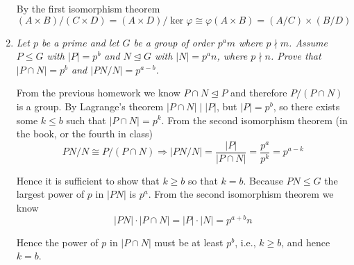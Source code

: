 \documentclass[letterpaper, 11pt]{article}
\begin{document}
\begin{enumerate}
By the first isomorphism theorem $$(A \times B)/(C \times D) = (A \times D)/\ker \varphi \cong \varphi(A \times B) = (A/C) \times (B/D)$$
\item \emph{Let $p$ be a prime and let $G$ be a group of order $p^am$ where $p \nmid m$.  Assume $P \leq G$ with $|P|=p^b$ and $N \unlhd G$ with $|N| = p^an$, where $p \nmid n$.  Prove that $|P \cap N| = p^b$ and $|PN/N| = p^{a-b}$.}

From the previous homework we know $P \cap N \unlhd P$ and therefore $P / (P \cap N)$ is a group.  By Lagrange's theorem $|P \cap N| \mid |P|$, but $|P| = p^b$, so there exists some $k \leq b$ such that $|P \cap N| = p^k$.  From the second isomorphism theorem (in the book, or the fourth in class)
\[
PN/N \cong P/(P \cap N) \Rightarrow |PN/N| = \frac{|P|}{|P \cap N|} = \frac{p^a}{p^k} = p^{a-k}
\]

Hence it is sufficient to show that $k \geq b$ so that $k = b$.  Because $PN \leq G$ the largest power of $p$ in $|PN|$ is $p^a$.  From the second isomorphism theorem we know $$|PN| \cdot |P \cap N| = |P|\cdot|N| = p^{a+b}n$$

Hence the power of $p$ in $|P \cap N|$ must be at least $p^b$, i.e., $k \geq b$, and hence $k = b$.
\end{enumerate}
\end{document}
